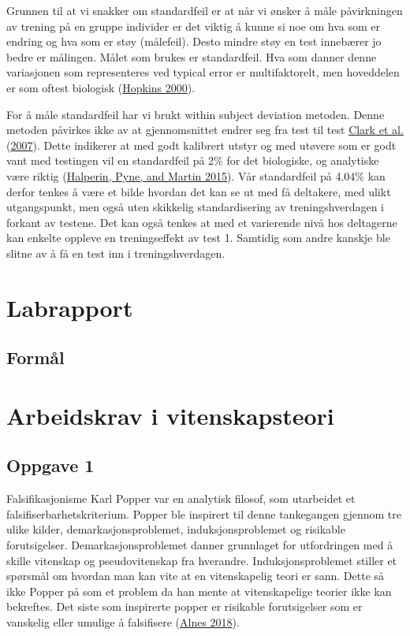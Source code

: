 \documentclass[
]{book}
\begin{document}
Grunnen til at vi snakker om standardfeil er at når vi ønsker å måle
påvirkningen av trening på en gruppe individer er det viktig å kunne si
noe om hva som er endring og hva som er støy (målefeil). Desto mindre
støy en test innebærer jo bedre er målingen. Målet som brukes er
standardfeil. Hva som danner denne variasjonen som representeres ved
typical error er multifaktorelt, men hoveddelen er som oftest biologisk
(\protect\hyperlink{ref-hopkins2000}{Hopkins 2000}).

For å måle standardfeil har vi brukt within subject deviation metoden.
Denne metoden påvirkes ikke av at gjennomsnittet endrer seg fra test til
test \protect\hyperlink{ref-clark2007}{Clark et al.}
(\protect\hyperlink{ref-clark2007}{2007}). Dette indikerer at med godt
kalibrert utstyr og med utøvere som er godt vant med testingen vil en
standardfeil på 2\% for det biologiske, og analytiske være riktig
(\protect\hyperlink{ref-halperin2015}{Halperin, Pyne, and Martin 2015}).
Vår standardfeil på 4.04\% kan derfor tenkes å være et bilde hvordan det
kan se ut med få deltakere, med ulikt utgangspunkt, men også uten
skikkelig standardisering av treningshverdagen i forkant av testene. Det
kan også tenkes at med et varierende nivå hos deltagerne kan enkelte
oppleve en treningseffekt av test 1. Samtidig som andre kanskje ble
slitne av å få en test inn i treningshverdagen.

\hypertarget{labrapport}{%
\chapter{Labrapport}\label{labrapport}}

\hypertarget{formuxe5l}{%
\section{Formål}\label{formuxe5l}}

\hypertarget{arbeidskrav-i-vitenskapsteori}{%
\chapter{Arbeidskrav i
vitenskapsteori}\label{arbeidskrav-i-vitenskapsteori}}

\hypertarget{oppgave-1}{%
\section{Oppgave 1}\label{oppgave-1}}

Falsifikasjonisme Karl Popper var en analytisk filosof, som utarbeidet
et falsifiserbarhetskriterium. Popper ble inspirert til denne
tankegangen gjennom tre ulike kilder, demarkasjonsproblemet,
induksjonsproblemet og risikable forutsigelser. Demarkasjonsproblemet
danner grunnlaget for utfordringen med å skille vitenskap og
pseudovitenskap fra hverandre. Induksjonsproblemet stiller et spørsmål
om hvordan man kan vite at en vitenskapelig teori er sann. Dette så ikke
Popper på som et problem da han mente at vitenskapelige teorier ikke kan
bekreftes. Det siste som inspirerte popper er risikable forutsigelser
som er vanskelig eller umulige å falsifisere
(\protect\hyperlink{ref-alnes2018}{Alnes 2018}).
\end{document}

